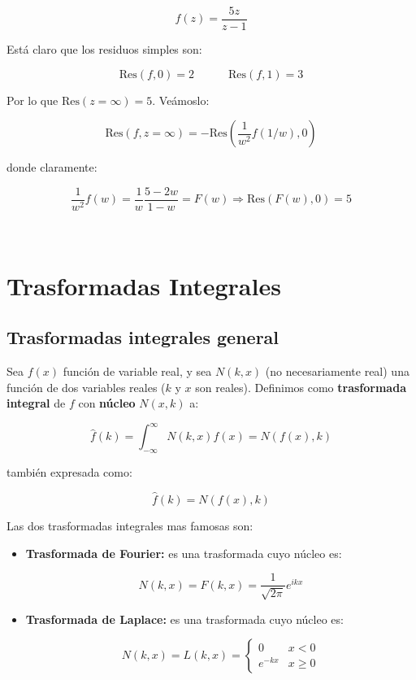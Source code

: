 \documentclass[12pt,a4paper]{book}
\newcommand{\Res}{\mathrm{Res}}
\newcommand{\hatf}{\widehat{f}}
\begin{document}
$$ f(z) = \frac{5 z}{z-1} $$

Está claro que los residuos simples son:

$$ \Res(f,0) = 2 \quad \quad \quad \Res(f,1) = 3 $$

Por lo que $\Res(z=\infty)  = 5$. Veámoslo:

$$ \Res (f,z=\infty) = - \Res(\dfrac{1}{w^2} f(1/w),0) $$


donde claramente:

$$ \dfrac{1}{w^2} f(w) =  \dfrac{1}{w} \dfrac{5-2w}{1-w} =F(w) \Longrightarrow  \Res(F(w),0) = 5 $$


\hrulefill \\




\newpage
\chapter{Trasformadas Integrales}
\section{Trasformadas integrales general}

Sea $f(x)$ función de variable real, y sea $N(k,x)$ (no necesariamente real) una función de dos variables reales ($k$ y $x$ son reales). Definimos como \textbf{trasformada integral} de $f$ con \textbf{núcleo} $N(x,k)$ a:

\begin{equation}
\widehat{f}(k) = \int_{-\infty}^{\infty} N(k,x) f(x) = N(f(x),k)
\end{equation}

también expresada como:

\begin{equation}
\hatf (k) = N(f(x),k)
\end{equation}


Las dos trasformadas integrales mas famosas son:


\begin{itemize}
\item \textbf{Trasformada de Fourier:} es una trasformada cuyo núcleo es:

\begin{equation}
N(k,x) = F(k,x) = \dfrac{1}{\sqrt{2 \pi}} e^{ikx}
\end{equation}

\item \textbf{Trasformada de Laplace:} es una trasformada cuyo núcleo es:

\begin{equation}
N(k,x) = L(k,x) =  \left\lbrace \begin{array}{ll} 0 & x < 0 \\ e^{-kx} & x \geq 0 \end{array} \right.
\end{equation}
\end{itemize}
\end{document}
